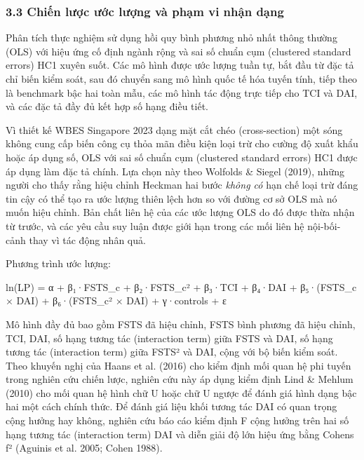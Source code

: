 \documentclass[12pt,a4paper]{article}
\begin{document}
\hypertarget{33-chiux1ebfn-lux1b0ux1ee3c-ux1b0ux1edbc-lux1b0ux1ee3ng-vuxe0-phux1ea1m-vi-nhux1eadn-dux1ea1ng}{%
\subsubsection{3.3 Chiến lược ước lượng và phạm vi nhận
dạng}\label{33-chiux1ebfn-lux1b0ux1ee3c-ux1b0ux1edbc-lux1b0ux1ee3ng-vuxe0-phux1ea1m-vi-nhux1eadn-dux1ea1ng}}

Phân tích thực nghiệm sử dụng hồi quy bình phương nhỏ nhất thông thường
(OLS) với hiệu ứng cố định ngành rộng và sai số chuẩn cụm (clustered
standard errors) HC1 xuyên suốt. Các mô hình được ước lượng tuần tự, bắt
đầu từ đặc tả chỉ biến kiểm soát, sau đó chuyển sang mô hình quốc tế hóa
tuyến tính, tiếp theo là benchmark bậc hai toàn mẫu, các mô hình tác
động trực tiếp cho TCI và DAI, và các đặc tả đầy đủ kết hợp số hạng điều
tiết.

Vì thiết kế WBES Singapore 2023 dạng mặt cắt chéo (cross-section) một
sóng không cung cấp biến công cụ thỏa mãn điều kiện loại trừ cho cường
độ xuất khẩu hoặc áp dụng số, OLS với sai số chuẩn cụm (clustered
standard errors) HC1 được áp dụng làm đặc tả chính. Lựa chọn này theo
Wolfolds \& Siegel (2019), những người cho thấy rằng hiệu chỉnh Heckman
hai bước \emph{không có} hạn chế loại trừ đáng tin cậy có thể tạo ra ước
lượng thiên lệch hơn so với đường cơ sở OLS mà nó muốn hiệu chỉnh. Bản
chất liên hệ của các ước lượng OLS do đó được thừa nhận từ trước, và các
yêu cầu suy luận được giới hạn trong các mối liên hệ nội-bối-cảnh thay
vì tác động nhân quả.

Phương trình ước lượng:

ln(LP) = α + β₁·FSTS\_c + β₂·FSTS\_c² + β₃·TCI + β₄·DAI + β₅·(FSTS\_c ×
DAI) + β₆·(FSTS\_c² × DAI) + γ·controls + ε

Mô hình đầy đủ bao gồm FSTS đã hiệu chỉnh, FSTS bình phương đã hiệu
chỉnh, TCI, DAI, số hạng tương tác (interaction term) giữa FSTS và DAI,
số hạng tương tác (interaction term) giữa FSTS² và DAI, cộng với bộ biến
kiểm soát. Theo khuyến nghị của Haans et al. (2016) cho kiểm định mối
quan hệ phi tuyến trong nghiên cứu chiến lược, nghiên cứu này áp dụng
kiểm định Lind \& Mehlum (2010) cho mối quan hệ hình chữ U hoặc chữ U
ngược để đánh giá hình dạng bậc hai một cách chính thức. Để đánh giá
liệu khối tương tác DAI có quan trọng cộng hưởng hay không, nghiên cứu
báo cáo kiểm định F cộng hưởng trên hai số hạng tương tác (interaction
term) DAI và diễn giải độ lớn hiệu ứng bằng Cohen\textquotesingle s f²
(Aguinis et al. 2005; Cohen 1988).
\end{document}
